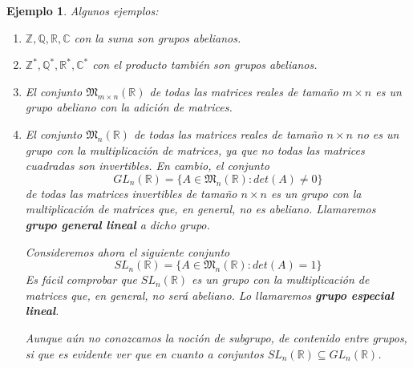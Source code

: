\documentclass[12pt]{article}
\newtheorem{example}{Ejemplo}[theorem]
\begin{document}
\begin{example} Algunos ejemplos:\begin{enumerate}
\item $\mathbb{Z}, \mathbb{Q}, \mathbb{R}, \mathbb{C}$ con la suma son grupos abelianos.
\item $\mathbb{Z}^{\ast}, \mathbb{Q}^{\ast}, \mathbb{R}^{\ast}, \mathbb{C}^{\ast}$ con el producto también son grupos abelianos.
\item El conjunto $\mathfrak{M}_{m \times n}(\mathbb{R})$ de todas las matrices reales de tamaño $m \times n$ es un grupo abeliano con la adición de matrices.
\item El conjunto $\mathfrak{M}_{n}(\mathbb{R})$ de todas las matrices reales de tamaño $n \times n$ no es un grupo con la multiplicación de matrices, ya que no todas las matrices cuadradas son invertibles. En cambio, el conjunto $$GL_{n}(\mathbb{R}) = \lbrace A \in \mathfrak{M}_{n}(\mathbb{R}) : det(A) \neq 0 \rbrace $$
de todas las matrices invertibles de tamaño $n \times n$ es un grupo con la multiplicación de matrices que, en general, no es abeliano. Llamaremos \textbf{grupo general lineal} a dicho grupo.

Consideremos ahora el siguiente conjunto $$SL_{n}(\mathbb{R}) = \lbrace A \in \mathfrak{M}_{n}(\mathbb{R}) : det(A) = 1 \rbrace $$
Es fácil comprobar que $SL_{n}(\mathbb{R})$ es un grupo con la multiplicación de matrices que, en general, no será abeliano. Lo llamaremos \textbf{grupo especial lineal}.

Aunque aún no conozcamos la noción de subgrupo, de contenido entre grupos, si que es evidente ver que en cuanto a conjuntos  $SL_{n}(\mathbb{R}) \subseteq GL_{n}(\mathbb{R})$.


\end{enumerate}
\end{example}
\end{document}
